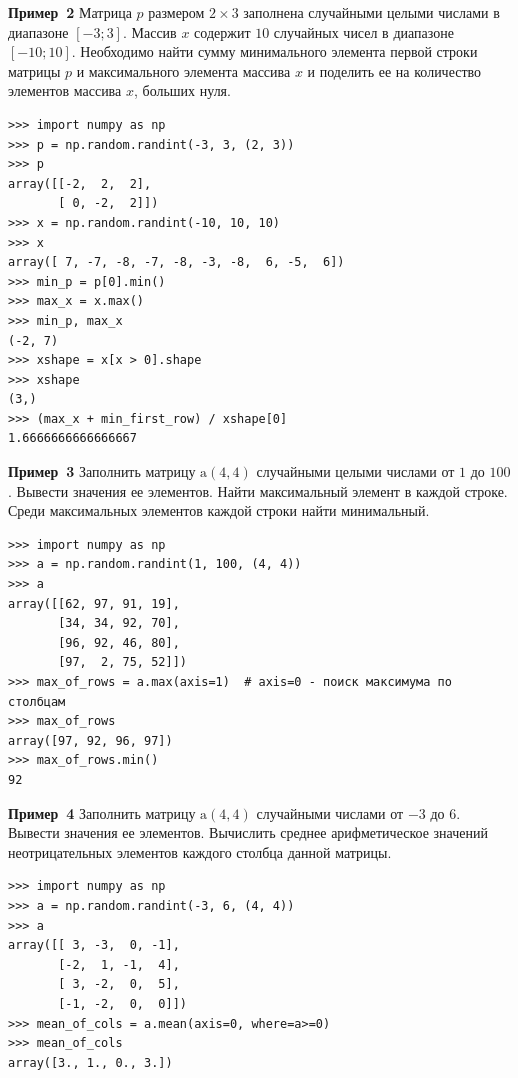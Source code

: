 \documentclass[aspectratio=169, mathserif]{beamer}%
\begin{document}
\begin{frame}[fragile]{\textcolor{tpugreen}{\textbf{Пример~2}}}
\scriptsize
Матрица $p$ размером $2 \times 3$ заполнена случайными целыми числами в диапазоне $\left[-3; 3\right]$. Массив $x$ содержит $10$ случайных чисел в диапазоне $\left[-10; 10\right]$. Необходимо найти сумму минимального элемента первой строки матрицы $p$ и максимального элемента массива $x$ и поделить ее на количество элементов массива $x$, больших нуля.
\vfill
\begin{verbatim}
>>> import numpy as np
>>> p = np.random.randint(-3, 3, (2, 3))
>>> p
array([[-2,  2,  2],
       [ 0, -2,  2]])
>>> x = np.random.randint(-10, 10, 10)
>>> x
array([ 7, -7, -8, -7, -8, -3, -8,  6, -5,  6])
>>> min_p = p[0].min()
>>> max_x = x.max()
>>> min_p, max_x
(-2, 7)
>>> xshape = x[x > 0].shape
>>> xshape
(3,)
>>> (max_x + min_first_row) / xshape[0]
1.6666666666666667
\end{verbatim}
\vfill
\end{frame}

\begin{frame}[fragile]{\textcolor{tpugreen}{\textbf{Пример~3}}}
\scriptsize
Заполнить матрицу $\mathrm{a}(4, 4)$ случайными целыми числами от $1$ до $100$. Вывести значения ее элементов. Найти максимальный элемент в каждой строке. Среди максимальных элементов каждой строки найти минимальный.
\vfill
\begin{verbatim}
>>> import numpy as np
>>> a = np.random.randint(1, 100, (4, 4))
>>> a
array([[62, 97, 91, 19],
       [34, 34, 92, 70],
       [96, 92, 46, 80],
       [97,  2, 75, 52]])
>>> max_of_rows = a.max(axis=1)  # axis=0 - поиск максимума по столбцам
>>> max_of_rows
array([97, 92, 96, 97])
>>> max_of_rows.min()
92
\end{verbatim}
\vfill
\end{frame}

\begin{frame}[fragile]{\textcolor{tpugreen}{\textbf{Пример~4}}}
\scriptsize
Заполнить матрицу $\mathrm{a}(4, 4)$ случайными числами от $-3$ до $6$. Вывести значения ее элементов. Вычислить среднее арифметическое значений неотрицательных элементов каждого столбца данной матрицы.
\vfill
\begin{verbatim}
>>> import numpy as np
>>> a = np.random.randint(-3, 6, (4, 4))
>>> a
array([[ 3, -3,  0, -1],
       [-2,  1, -1,  4],
       [ 3, -2,  0,  5],
       [-1, -2,  0,  0]])
>>> mean_of_cols = a.mean(axis=0, where=a>=0)
>>> mean_of_cols
array([3., 1., 0., 3.])
\end{verbatim}
\vfill
\end{frame}
\end{document}
